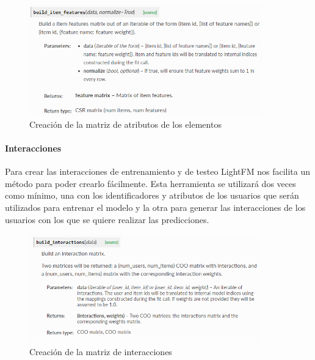 \begin{figure}[H]
    \centering
    \includegraphics[width=0.9\textwidth]{Figuras/LightFM_build_item_features.png}    
    \caption{Creación de la matriz de atributos de los elementos} 
    \label{fig:BuildItemFeatures}
\end{figure}

\paragraph{Interacciones}
Para crear las interacciones de entrenamiento y de testeo LightFM nos facilita un método para poder crearlo fácilmente. Esta herramienta se utilizará dos veces como mínimo, una con los identificadores y atributos de los usuarios que serán utilizados para entrenar el modelo y la otra para generar las interacciones de los usuarios con los que se quiere realizar las predicciones.
\begin{figure}[H]
    \centering
    \includegraphics[width=0.9\textwidth]{Figuras/LightFM_build_interactions.png}    
    \caption{Creación de la matriz de interacciones} 
    \label{fig:BuildInteractions}
\end{figure}

